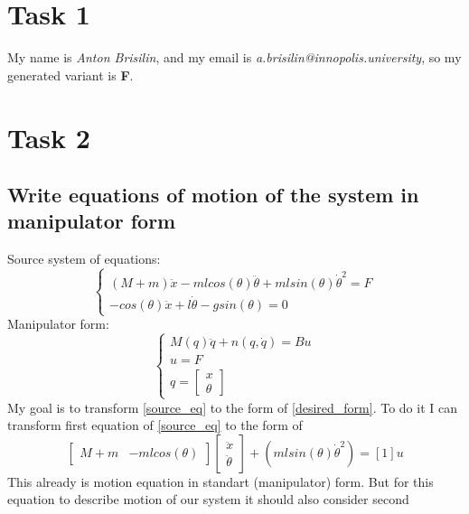 \documentclass[a4paper,12pt]{article}
\begin{document}
\section{Task 1}
My name is \textit{Anton Brisilin}, and my email is 
\textit{a.brisilin@innopolis.university}, so my generated variant is \textbf{F}.
\section{Task 2}
    \subsection{Write equations of motion of the system in manipulator form}
    Source system of equations:
    \begin{equation}\label{source_eq}
        \begin{cases}
            (M+m)\ddot{x}-mlcos(\theta)\ddot{\theta}+mlsin(\theta)\dot\theta^2=F\\
            -cos(\theta)\ddot{x}+l\dot{\theta}-gsin(\theta)=0
        \end{cases}
    \end{equation}
    Manipulator form:
    \begin{equation}
        \begin{cases}\label{desired_form}
            M(q)\ddot{q}+n(q,\dot{q})=Bu\\
            u=F\\
            q=\begin{bmatrix}x \\ \theta\end{bmatrix}
        \end{cases}
    \end{equation}
    My goal is to transform \ref{source_eq} to the form of \ref{desired_form}. 
    To do it I can transform first equation of \ref{source_eq} to the form of
    \begin{equation}\label{first_part}
        \begin{bmatrix}
            M+m & -mlcos(\theta)
        \end{bmatrix}
        \begin{bmatrix}
            \ddot x \\ 
            \ddot\theta
        \end{bmatrix}
         + (mlsin(\theta)\dot\theta^2) = [1]u
    \end{equation}
    This already is motion equation in standart (manipulator) form. But for this
    equation to describe motion of our system it should also consider second
\end{document}
